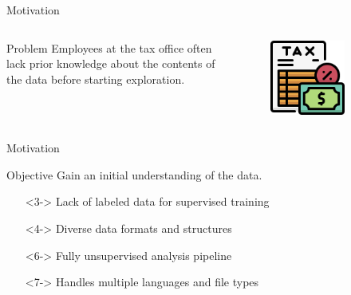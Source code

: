 \begin{frame}{Motivation} 
    \begin{columns}
        \begin{column}{0.8\textwidth}
            \begin{alertblock}{Problem} 
            Employees at the tax office often lack prior knowledge about the contents of the data before starting exploration.
            \end{alertblock}

        \end{column}
        \begin{column}{0.18\textwidth}
            \begin{figure}
                \centering
                \includegraphics[width=0.7\textwidth]{images/motivation/tax.png}
            \end{figure}
        \end{column}
    \end{columns}
\end{frame}


\begin{frame}{Motivation} 
    \begin{exampleblock}{Objective} 
    Gain an initial understanding of the data.
    \end{exampleblock}

    \begin{itemize}
        \item[\ding{55}]<3-> Lack of labeled data for supervised training
        \item[\ding{55}]<4-> Diverse data formats and structures
    \end{itemize}

    \begin{itemize}
        \item[\ding{51}]<6-> Fully unsupervised analysis pipeline
        \item[\ding{51}]<7-> Handles multiple languages and file types
    \end{itemize}
\end{frame}